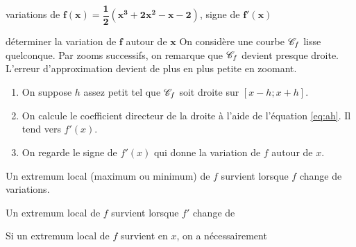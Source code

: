 \begin{exemple*}{variations de $\mathbf{f(x) = \dfrac12(x^3 + 2x^2 - x - 2)}$, signe de $\mathbf{f'(x)}$}{}
	\begin{center}
	\end{center}
\end{exemple*}

\begin{strategie*}{déterminer la variation de $\mathbf{f}$ autour de $\mathbf{x}$}{}
	On considère une courbe $\mathcal{C}_f$ lisse quelconque.
	Par zooms successifs, on remarque que $\mathcal{C}_f$ devient presque droite.
	L'erreur d'approximation devient de plus en plus petite en zoomant.
	
	\begin{enumerate}
		\item On suppose $h$ assez petit tel que $\mathcal{C}_f$ soit droite sur $[x-h ; x+h]$.
		\item On calcule le coefficient directeur de la droite à l'aide de l'équation \eqref{eq:ah}. Il tend vers $f'(x)$.
		\item On regarde le signe de $f'(x)$ qui donne la variation de $f$ autour de $x$.
	\end{enumerate}
\end{strategie*}

\begin{rappel*}{}{}
	Un extremum local (maximum ou minimum) de $f$ survient lorsque $f$ change de variations.
\end{rappel*}

\begin{propriete}{}{}
		\begin{center}
			Un extremum local de $f$ survient lorsque $f'$ change de \qquad\qquad\qquad\qquad
		\end{center}
		\begin{center}
			Si un extremum local de $f$ survient en $x$, on a nécessairement \qquad\qquad\qquad\qquad
		\end{center}
\end{propriete}


